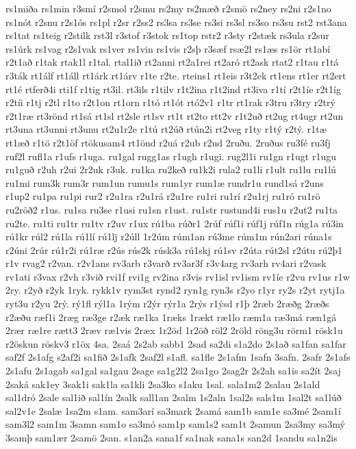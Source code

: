 {rs1miða
rs1min
r3smí
r2smol
r2smu
rs2my
rs2mæð
r2smö
rs2ney
rs2ni
r2s1no
rs1nót
r2snu
r2s1ós
rs1pl
r2sr
r2ss2
rs3sa
rs3se
rs3si
rs3sl
rs3so
rs3su
rst2
rst3ana
rs1tat
rs1teig
r2stilk
rst3l
r3stof
r3stok
rs1top
rstr2
r3sty
r2stæk
rs3ula
r2sur
rs1úrk
rs1vag
r2s1vak
rs1ver
rs1vin
rs1vis
r2sþ
r3sæf
rsæ2l
rs1æs
rs1ör
rt1abí
r2t1að
r1tak
rtak1l
r1tal.
rtal1ið
rt2anni
rt2a1rei
rt2aró
rt2ask
rtat2
r1tau
r1tá
r3ták
rt1álf
rt1áll
rt1árk
rt1árv
r1te
r2te.
rteins1
rt1eis
r3t2ek
rt1ens
rt1er
rt2ert
rt1é
rtferð4i
rti1f
r1tig
rt3il.
rt3ils
r1tilv
r1t2ina
r1t2ind
rt3iva
r1tí
r2t1íe
r2t1íg
r2tíi
r1tj
r2tl
r1to
r2t1on
rt1orn
r1tó
rt1ót
rtó2v1
r1tr
rt1rak
r3tru
r3try
r2trý
r2t1ræ
rt3rönd
rt1sá
rt1sl
rt2sle
rt1sv
rt1t
rt2to
rtt2v
r1t2uð
rt2ug
rt4ugr
rt2un
rt3una
rt3unni
rt3unu
rt2u1r2e
r1tú
rt2úð
rtún2i
rt2veg
r1ty
r1tý
r2tý.
r1tæ
rt1æð
r1tö
r2t1öf
rtökusam4
rt1önd
r2uá
r2ub
r2ud
2ruðu.
2ruðus
ru3fé
ru3fj
ruf2l
rufl1a
r1ufs
r1uga.
ru1gal
rugg1as
r1ugh
r1ugi.
rug2l1i
ru1gn
r1ugt
r1ugu
ru1guð
r2uh
r2ui
2r2uk
r3uk.
ru1ka
ru2keð
ru1k2i
rula2
ru1li
r1ult
ru1lu
ru1lú
ru1mi
rum3k
rum3r
rum1un
rumu1s
rum1yr
rum1æ
rundr1u
rund1sá
r2uns
r1up2
ru1pa
ru1pi
rur2
r2u1ra
r2u1rá
r2u1re
ru1ri
ru1rí
r2u1rj
ru1ró
ru1rö
ru2röð2
r1us.
ru1sa
ru3se
r1usi
ru1sn
r1ust.
ru1str
rustund4i
rus1u
r2ut2
ru1ta
ru2te.
ru1ti
ru1tr
ru1tv
r2uv
r1ux
rú1ba
rúðr1
2rúf
rúf1i
rúf1j
rúf1n
rúg1a
rú3in
rú1kr
rúl2
rú1la
rú1lí
rú1lj
r2úll
1r2úm
rúm1an
rú3me
rúm1m
rún2ari
rúna1s
r2úni
2rúr
rú1r2i
rú1ræ
r2ús
rús2k
rúsk3a
rú1skj
rú1sv
r2úta
rút2sl
r2útu
rú2þ1
r1v
rvag2
r2van.
r2v1ans
rv3arb
r3varð
rv3ar3f
r3v4arg
rv3arh
rv4ari
r2vask
rv1ati
r3vax
r2vh
r3við
rvi1f
rvi1g
rv2ina
r3vis
rv1isl
rv1ism
rv1íe
r2vu
rv1us
r1w
2ry.
r2yð
r2yk
1ryk.
rykk1v
rym3st
rynd2
ryn1g
ryn3s
r2yo
r1yr
ry2s
r2yt
rytj1a
ryt3u
r2yu
2rý.
rý1fl
rýl1a
1rým
r2ýr
rýr1a
2rýs
r1ýsd
r1þ
2ræb
2ræðg
2ræðs
r2æðu
ræf1i
2ræg
ræ3ge
r2æk
ræ1ka
1ræks
1rækt
ræ1lo
ræm1a
ræ3má
ræn1gá
2rær
ræ1re
rætt3
2ræv
ræ1vis
2ræx
1r2öd
1r2öð
röl2
2röld
röng3u
rörm1
rösk1u
r2öskun
röskv3
r1öx
4sa.
2saá
2s2ab
sabb1
2sad
sa2di
s1a2do
2s1að
sa1fan
sa1far
saf2f
2s1afg
s2af2i
sa1fið
2s1afk
2saf2l
s1afl.
sa1fle
2s1afm
1safn
3safn.
2safr
2s1afs
2s1afu
2s1agab
sa1gal
sa1gau
2sage
sa1g2l2
2sa1go
2sag2r
2s2ah
sa1is
sa2ít
2saj
2saká
sak1ey
3sak1i
sak1la
sa1kli
2sa3ko
s1aku
1sal.
sala1m2
2salau
2s1ald
sal1dró
2sale
sal1ið
sal1ín
2salk
sall1an
2salm
1s2aln
1sal2s
sals1m
1sal2t
sa1lúð
sal2v1e
2salæ
1sa2m
s1am.
sam3arí
sa3mark
2samá
sam1b
sam1e
sa3mé
2sam1í
sam3l2
sam1m
3samn
sam1o
sa3mó
sam1p
sam1s2
sam1t
2samun
2sa3my
sa3mý
3samþ
sam1ær
2samö
2san.
s1an2a
sana1f
sa1nak
sana1s
san2d
1sandu
sa1n2is
}
